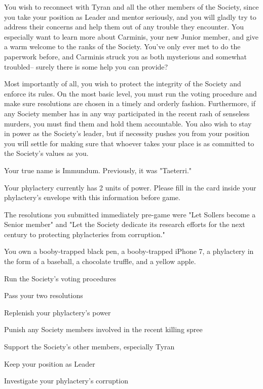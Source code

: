 \documentclass[char]{Sel}
\begin{document}
You wish to reconnect with Tyran and all the other members of the Society, since you take your position as Leader and mentor seriously, and you will gladly try to address their concerns and help them out of any trouble they encounter. You especially want to learn more about Carminis, your new Junior member, and give a warm welcome to the ranks of the Society. You've only ever met to do the paperwork before, and Carminis struck you as both mysterious and somewhat troubled-- surely there is some help you can provide?

Most importantly of all, you wish to protect the integrity of the Society and enforce its rules. On the most basic level, you must run the voting procedure and make sure resolutions are chosen in a timely and orderly fashion. Furthermore, if any Society member has in any way participated in the recent rash of senseless murders, you must find them and hold them accountable. You also wish to stay in power as the Society's leader, but if necessity pushes you from your position you will settle for making sure that whoever takes your place is as committed to the Society's values as you.
\begin{itemz}[Notes]
  \item Your true name is Immundum. Previously, it was "Taeterri."
    \item Your phylactery currently has 2 units of power. Please fill in the card inside your phylactery's envelope with this information before game.
  \item The resolutions you submitted immediately pre-game were "Let Sollers become a Senior member" and "Let the Society dedicate its research efforts for the next century to protecting phylacteries from corruption."
  \item You own a booby-trapped black pen, a booby-trapped iPhone 7, a phylactery in the form of a baseball, a chocolate truffle, and a yellow apple.
    \end{itemz}
    

     \begin{itemz}[Goals]
     \item Run the Society's voting procedures
 \item Pass your two resolutions
 \item Replenish your phylactery's power
\item Punish any Society members involved in the recent killing spree
\item Support the Society's other members, especially Tyran
\item Keep your position as Leader
\item Investigate your phylactery's corruption
\end{itemz}
\end{document}
